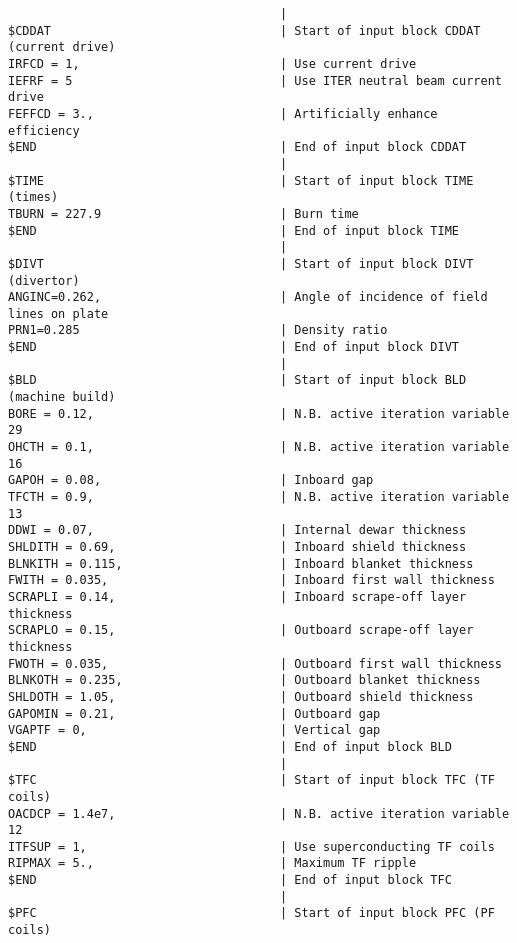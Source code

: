 \documentclass[11pt,a4paper]{report}
\begin{document}
\begin{verbatim}
                                      | 
$CDDAT                                | Start of input block CDDAT (current drive)
IRFCD = 1,                            | Use current drive
IEFRF = 5                             | Use ITER neutral beam current drive
FEFFCD = 3.,                          | Artificially enhance efficiency
$END                                  | End of input block CDDAT
                                      | 
$TIME                                 | Start of input block TIME (times)
TBURN = 227.9                         | Burn time
$END                                  | End of input block TIME
                                      | 
$DIVT                                 | Start of input block DIVT (divertor)
ANGINC=0.262,                         | Angle of incidence of field lines on plate
PRN1=0.285                            | Density ratio
$END                                  | End of input block DIVT
                                      | 
$BLD                                  | Start of input block BLD (machine build)
BORE = 0.12,                          | N.B. active iteration variable 29
OHCTH = 0.1,                          | N.B. active iteration variable 16
GAPOH = 0.08,                         | Inboard gap
TFCTH = 0.9,                          | N.B. active iteration variable 13
DDWI = 0.07,                          | Internal dewar thickness
SHLDITH = 0.69,                       | Inboard shield thickness
BLNKITH = 0.115,                      | Inboard blanket thickness
FWITH = 0.035,                        | Inboard first wall thickness
SCRAPLI = 0.14,                       | Inboard scrape-off layer thickness
SCRAPLO = 0.15,                       | Outboard scrape-off layer thickness
FWOTH = 0.035,                        | Outboard first wall thickness
BLNKOTH = 0.235,                      | Outboard blanket thickness
SHLDOTH = 1.05,                       | Outboard shield thickness
GAPOMIN = 0.21,                       | Outboard gap
VGAPTF = 0,                           | Vertical gap
$END                                  | End of input block BLD
                                      | 
$TFC                                  | Start of input block TFC (TF coils)
OACDCP = 1.4e7,                       | N.B. active iteration variable 12
ITFSUP = 1,                           | Use superconducting TF coils
RIPMAX = 5.,                          | Maximum TF ripple
$END                                  | End of input block TFC
                                      | 
$PFC                                  | Start of input block PFC (PF coils)

\end{verbatim}
\end{document}
